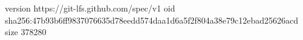 version https://git-lfs.github.com/spec/v1
oid sha256:47b93b6ff9837076635d78eedd574daa1d6a5f2f804a38e79c12ebad25626acd
size 378280
